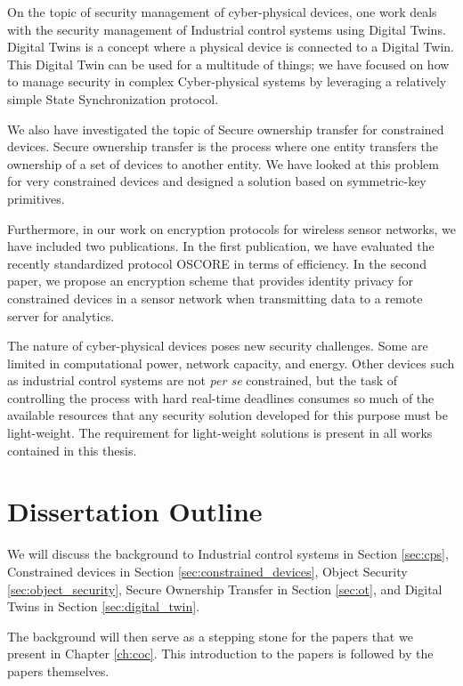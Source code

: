On the topic of security management of cyber-physical devices, one work deals with the security management of Industrial control systems using Digital Twins. Digital Twins is a concept where a physical device is connected to a Digital Twin. This Digital Twin can be used for a multitude of things; we have focused on how to manage security in complex Cyber-physical systems by leveraging a relatively simple State Synchronization protocol.

We also have investigated the topic of Secure ownership transfer for constrained devices. Secure ownership transfer is the process where one entity transfers the ownership of a set of devices to another entity. We have looked at this problem for very constrained devices and designed a solution based on symmetric-key primitives.

Furthermore, in our work on encryption protocols for wireless sensor networks, we have included two publications. In the first publication, we have evaluated the recently standardized protocol OSCORE in terms of efficiency.
In the second paper, we propose an encryption scheme that provides identity privacy for constrained devices in a sensor network when transmitting data to a remote server for analytics.

The nature of cyber-physical devices poses new security challenges. Some are limited in computational power, network capacity, and energy. Other devices such as industrial control systems are not \emph{per se} constrained, but the task of controlling the process with hard real-time deadlines consumes so much of the available resources that any security solution developed for this purpose must be light-weight. The requirement for light-weight solutions is present in all works contained in this thesis.

\section{Dissertation Outline}

 We will discuss the background to Industrial control systems in Section \ref{sec:cps}, Constrained devices in Section \ref{sec:constrained_devices}, Object Security \ref{sec:object_security}, Secure Ownership Transfer in Section \ref{sec:ot}, and Digital Twins in Section \ref{sec:digital_twin}. 

The background will then serve as a stepping stone for the papers that we present in Chapter \ref{ch:coc}. This introduction to the papers is followed by the papers themselves.


